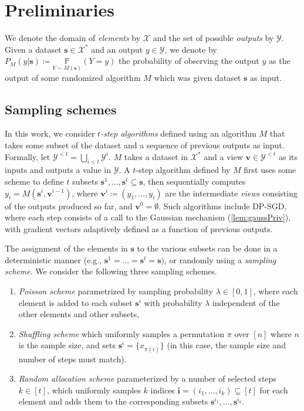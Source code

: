 \documentclass{article}
\newcommand{\Arxiv}[1]{}
\newcommand{\arxvFtnt}[1]{}
\newcommand{\Arxiv}[1]{#1}
\newcommand{\arxvFtnt}[1]{\footnote{#1}}
\theoremstyle{plain}
\theoremstyle{definition}
\newcommand{\out}{y}
\newcommand{\outRV}{Y}
\newcommand{\outDom}{\mathcal{Y}}
\newcommand{\alg}{M}
\newcommand{\domain}{\mathcal{X}}
\newcommand{\dataset}{\boldsymbol{s}}
\newcommand{\view}{\boldsymbol{v}}
\newcommand{\prob}[2]{\underset{#1}{\mathbb{P}} \left(#2 \right)}
\begin{document}
\section{Preliminaries}
We denote the domain of \emph{elements} by $\domain$ and the set of possible \emph{outputs} by $\outDom$.
Given a dataset $\dataset \in \domain^{*}$ and an output $\out \in \outDom$, we denote by $P_{\alg}(\out \vert \dataset) \coloneqq \prob{\outRV \sim \alg(\dataset)}{\outRV = \out}$ the probability of observing the output $\out$ as the output of some randomized algorithm $\alg$ which was given dataset $\dataset$ as input.\arxvFtnt{In case of measurable spaces, this quantity represents the probability density function rather than the probability mass function} \Arxiv{We omit the subscript when the algorithm is clear from the context.}

\subsection{Sampling schemes}\label{sec:schm}
In this work, we consider \emph{$t$-step algorithms} defined using an algorithm $\alg$ that takes some subset of the dataset and a sequence of previous outputs as input. Formally, let $\outDom^{<t}=\bigcup_{i<t} \outDom^{i}$. $\alg$ takes a dataset in $\domain^{*}$ and a view $\view\in\outDom^{<t}$ as its inputs and outputs a value in $\outDom$. A $t$-step algorithm defined by $\alg$ first uses some scheme to define $t$ subsets $\dataset^{1}, \ldots, \dataset^{t} \subseteq \dataset$, then sequentially computes $\out_{i} = \alg \left(\dataset^{i}, \view^{i - 1} \right)$, where $\view^{i} \coloneqq (\out_{1}, \ldots, \out_{i})$ are the intermediate \emph{views} consisting of the outputs produced so far, and $\view^{0} = \emptyset$.
Such algorithms include DP-SGD, where each step consists of a call to the Gaussian mechanism (\ref{lem:gaussPriv}), with gradient vectors adaptively defined as a function of previous outputs.

The assignment of the elements in $\dataset$ to the various subsets can be done in a deterministic manner (e.g., $\dataset^{1} = \ldots = \dataset^{t} = \dataset)$, or randomly using a \emph{sampling scheme}. We consider the following three sampling schemes.
\begin{enumerate}
    \item 
    \emph{Poisson scheme} parametrized by sampling probability $\lambda \in [0, 1]$, where each element is added to each subset $\dataset^{i}$ with probability $\lambda$ independent of the other elements and other subsets,
    \item \emph{Shuffling scheme} which uniformly samples a permutation $\pi$ over $[n]$ where $n$ is the sample size, and sets $\dataset^{i} = \{x_{\pi(i)}\}$ (in this case, the sample size and number of steps must match).
   \item \emph{Random allocation scheme} parameterized by a number of selected steps $k \in [t]$, which uniformly samples $k$ indices $\boldsymbol{i} = (i_{1}, \ldots, i_{k}) \subseteq [t]$ for each element and adds them to the corresponding subsets $\dataset^{i_{1}}, \ldots, \dataset^{i_{k}}$.
\end{enumerate}
\end{document}
